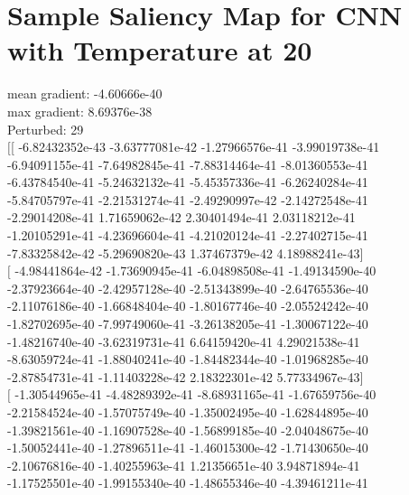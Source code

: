 \documentclass{article}
\begin{document}
\section{Sample Saliency Map for CNN with Temperature at 20}
mean gradient: -4.60666e-40\\
max gradient: 8.69376e-38\\
Perturbed: 29\\
$[$[ -6.82432352e-43  -3.63777081e-42  -1.27966576e-41  -3.99019738e-41\\
   -6.94091155e-41  -7.64982845e-41  -7.88314464e-41  -8.01360553e-41\\
   -6.43784540e-41  -5.24632132e-41  -5.45357336e-41  -6.26240284e-41\\
   -5.84705797e-41  -2.21531274e-41  -2.49290997e-42  -2.14272548e-41\\
   -2.29014208e-41   1.71659062e-42   2.30401494e-41   2.03118212e-41\\
   -1.20105291e-41  -4.23696604e-41  -4.21020124e-41  -2.27402715e-41\\
   -7.83325842e-42  -5.29690820e-43   1.37467379e-42   4.18988241e-43$]$\\
 $[$ -4.98441864e-42  -1.73690945e-41  -6.04898508e-41  -1.49134590e-40\\
   -2.37923664e-40  -2.42957128e-40  -2.51343899e-40  -2.64765536e-40\\
   -2.11076186e-40  -1.66848404e-40  -1.80167746e-40  -2.05524242e-40\\
   -1.82702695e-40  -7.99749060e-41  -3.26138205e-41  -1.30067122e-40\\
   -1.48216740e-40  -3.62319731e-41   6.64159420e-41   4.29021538e-41\\
   -8.63059724e-41  -1.88040241e-40  -1.84482344e-40  -1.01968285e-40\\
   -2.87854731e-41  -1.11403228e-42   2.18322301e-42   5.77334967e-43$]$\\
 $[$ -1.30544965e-41  -4.48289392e-41  -8.68931165e-41  -1.67659756e-40\\
   -2.21584524e-40  -1.57075749e-40  -1.35002495e-40  -1.62844895e-40\\
   -1.39821561e-40  -1.16907528e-40  -1.56899185e-40  -2.04048675e-40\\
   -1.50052441e-40  -1.27896511e-41  -1.46015300e-42  -1.71430650e-40\\
   -2.10676816e-40  -1.40255963e-41   1.21356651e-40   3.94871894e-41\\
   -1.17525501e-40  -1.99155340e-40  -1.48655346e-40  -4.39461211e-41\\
\end{document}
